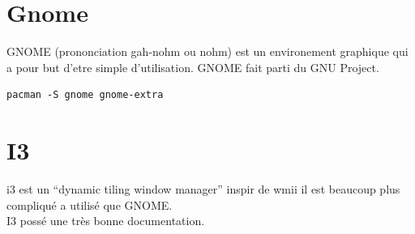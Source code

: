 \documentclass[a4paper]{book}
\begin{document}
\section{Gnome}
GNOME (prononciation gah-nohm ou nohm) est un environement graphique qui a
pour but d'etre simple d'utilisation. GNOME fait parti du GNU Project.
\begin{lstlisting}
pacman -S gnome gnome-extra
\end{lstlisting}
\section{I3}
i3 est un ``dynamic tiling window manager'' inspir de wmii il est beaucoup
plus compliqu\'e a utilis\'e que GNOME.\\
I3 poss\'e une très bonne documentation.%

\end{document}
